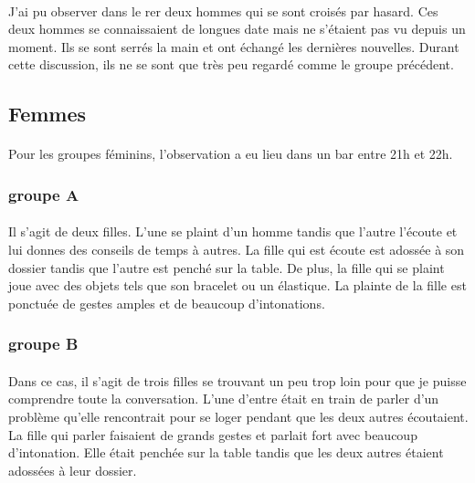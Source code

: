 \paragraph{} J'ai pu observer dans le rer deux hommes qui se sont croisés par
hasard. Ces deux hommes se connaissaient de longues date mais ne s'étaient pas
vu depuis un moment. Ils se sont serrés la main et ont échangé les dernières
nouvelles. Durant cette discussion, ils ne se sont que très peu regardé comme
le groupe précédent.

\subsection{Femmes}

\paragraph{} Pour les groupes féminins, l'observation a eu lieu dans un bar
entre 21h et 22h.

\subsubsection{groupe A}

\paragraph{} Il s'agit de deux filles. L'une se plaint d'un homme tandis que
l'autre l'écoute et lui donnes des conseils de temps à autres. La fille qui est
écoute est adossée à son dossier tandis que l'autre est penché sur la table. De
plus, la fille qui se plaint joue avec des objets tels que son bracelet ou un
élastique. La plainte de la fille est ponctuée de gestes amples et de beaucoup
d'intonations.

\subsubsection{groupe B}

\paragraph{} Dans ce cas, il s'agit de trois filles se trouvant un peu trop
loin pour que je puisse comprendre toute la conversation. L'une d'entre était
en train de parler d'un problème qu'elle rencontrait pour se loger pendant que
les deux autres écoutaient. La fille qui parler faisaient de grands gestes et
parlait fort avec beaucoup d'intonation. Elle était penchée sur la table tandis
que les deux autres étaient adossées à leur dossier.

